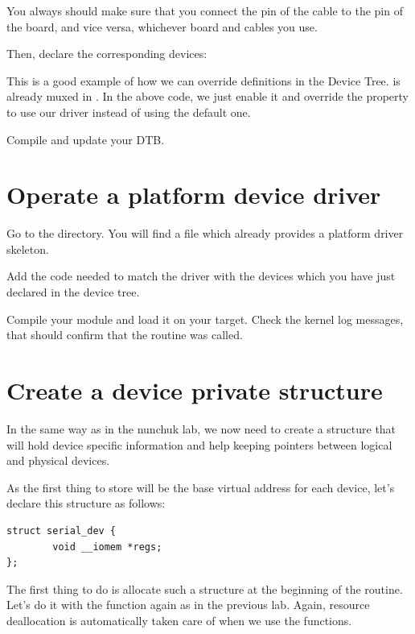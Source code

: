 You always should make sure that you connect the  pin of the cable
to the  pin of the board, and vice versa, whichever board and
cables you use.


Then, declare the corresponding devices:


This is a good example of how we can override definitions in the Device Tree.
 is already muxed in
. In the above code, we
just enable it and override the  property to use our driver
instead of using the default one.

Compile and update your DTB.

\section{Operate a platform device driver}

Go to the  directory.
You will find a  file which already provides a platform
driver skeleton.

Add the code needed to match the driver with the devices which you have
just declared in the device tree.

Compile your module and load it on your target. Check the kernel log
messages, that should confirm that the  routine was
called.

\section{Create a device private structure}

In the same way as in the nunchuk lab, we now need to create a
structure that will hold device specific information and help
keeping pointers between logical and physical devices.

As the first thing to store will be the base virtual address for
each device, let's declare this structure as follows:

\begin{verbatim}
struct serial_dev {
        void __iomem *regs;
};
\end{verbatim}

The first thing to do is allocate such a structure at the beginning
of the  routine. Let's do it with the 
function again as in the previous lab. Again, resource deallocation is
automatically taken care of when we use the  functions.

